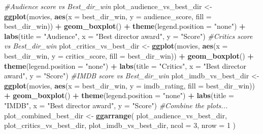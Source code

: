 \documentclass[]{article}
\newenvironment{Shaded}{\begin{snugshade}}{\end{snugshade}}
\newcommand{\KeywordTok}[1]{\textcolor[rgb]{0.13,0.29,0.53}{\textbf{#1}}}
\newcommand{\DataTypeTok}[1]{\textcolor[rgb]{0.13,0.29,0.53}{#1}}
\newcommand{\DecValTok}[1]{\textcolor[rgb]{0.00,0.00,0.81}{#1}}
\newcommand{\StringTok}[1]{\textcolor[rgb]{0.31,0.60,0.02}{#1}}
\newcommand{\CommentTok}[1]{\textcolor[rgb]{0.56,0.35,0.01}{\textit{#1}}}
\newcommand{\OperatorTok}[1]{\textcolor[rgb]{0.81,0.36,0.00}{\textbf{#1}}}
\newcommand{\NormalTok}[1]{#1}
\begin{document}
\begin{Shaded}
\begin{Highlighting}[]
\CommentTok{#Audience score vs Best_dir_win}
\NormalTok{plot_audience_vs_best_dir <-}
\StringTok{  }\KeywordTok{ggplot}\NormalTok{(movies,}
         \KeywordTok{aes}\NormalTok{(}\DataTypeTok{x =}\NormalTok{ best_dir_win, }\DataTypeTok{y =}\NormalTok{ audience_score, }\DataTypeTok{fill =}\NormalTok{ best_dir_win)) }\OperatorTok{+}\StringTok{ }\KeywordTok{geom_boxplot}\NormalTok{() }\OperatorTok{+}\StringTok{ }\KeywordTok{theme}\NormalTok{(}\DataTypeTok{legend.position =} \StringTok{"none"}\NormalTok{) }\OperatorTok{+}\StringTok{ }\KeywordTok{labs}\NormalTok{(}\DataTypeTok{title =} \StringTok{"Audience"}\NormalTok{, }\DataTypeTok{x =} \StringTok{"Best director award"}\NormalTok{, }\DataTypeTok{y =} \StringTok{"Score"}\NormalTok{)}
\CommentTok{#Critics score vs Best_dir_win}
\NormalTok{plot_critics_vs_best_dir <-}
\StringTok{  }\KeywordTok{ggplot}\NormalTok{(movies,}
         \KeywordTok{aes}\NormalTok{(}\DataTypeTok{x =}\NormalTok{ best_dir_win, }\DataTypeTok{y =}\NormalTok{ critics_score, }\DataTypeTok{fill =}\NormalTok{ best_dir_win)) }\OperatorTok{+}\StringTok{ }\KeywordTok{geom_boxplot}\NormalTok{() }\OperatorTok{+}\StringTok{ }\KeywordTok{theme}\NormalTok{(}\DataTypeTok{legend.position =} \StringTok{"none"}\NormalTok{) }\OperatorTok{+}\StringTok{ }\KeywordTok{labs}\NormalTok{(}\DataTypeTok{title =} \StringTok{"Critics"}\NormalTok{, }\DataTypeTok{x =} \StringTok{"Best director award"}\NormalTok{, }\DataTypeTok{y =} \StringTok{"Score"}\NormalTok{)}
\CommentTok{#IMDB score vs Best_dir_win}
\NormalTok{plot_imdb_vs_best_dir <-}
\StringTok{  }\KeywordTok{ggplot}\NormalTok{(movies, }\KeywordTok{aes}\NormalTok{(}\DataTypeTok{x =}\NormalTok{ best_dir_win, }\DataTypeTok{y =}\NormalTok{ imdb_rating, }\DataTypeTok{fill =}\NormalTok{ best_dir_win)) }\OperatorTok{+}
\StringTok{  }\KeywordTok{geom_boxplot}\NormalTok{() }\OperatorTok{+}\StringTok{ }\KeywordTok{theme}\NormalTok{(}\DataTypeTok{legend.position =} \StringTok{"none"}\NormalTok{) }\OperatorTok{+}\StringTok{ }\KeywordTok{labs}\NormalTok{(}\DataTypeTok{title =} \StringTok{"IMDB"}\NormalTok{, }\DataTypeTok{x =} \StringTok{"Best director award"}\NormalTok{, }\DataTypeTok{y =} \StringTok{"Score"}\NormalTok{)}
\CommentTok{#Combine the plots...}
\NormalTok{plot_combined_best_dir <-}
\StringTok{  }\KeywordTok{ggarrange}\NormalTok{(}
\NormalTok{    plot_audience_vs_best_dir,}
\NormalTok{    plot_critics_vs_best_dir,}
\NormalTok{    plot_imdb_vs_best_dir,}
    \DataTypeTok{ncol =} \DecValTok{3}\NormalTok{,}
    \DataTypeTok{nrow =} \DecValTok{1}
\NormalTok{  )}


\end{Highlighting}
\end{Shaded}
\end{document}
